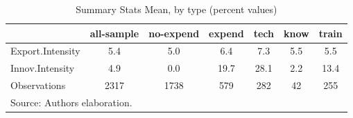 \begin{table}[htbp]\centering
\def\sym#1{\ifmmode^{#1}\else\(^{#1}\)\fi}
\caption{Summary Stats Mean, by type (percent values)}
\begin{tabular}{l*{6}{c}}
\hline\hline
                    &  all-sample&   no-expend&      expend&        tech&        know&       train\\
\hline
Export.Intensity    &         5.4&         5.0&         6.4&         7.3&         5.5&         5.5\\
Innov.Intensity     &         4.9&         0.0&        19.7&        28.1&         2.2&        13.4\\
\hline
Observations        &        2317&        1738&         579&         282&          42&         255\\
\hline\hline
\multicolumn{7}{l}{\footnotesize Source: Authors elaboration.}\\
\end{tabular}
\end{table}
